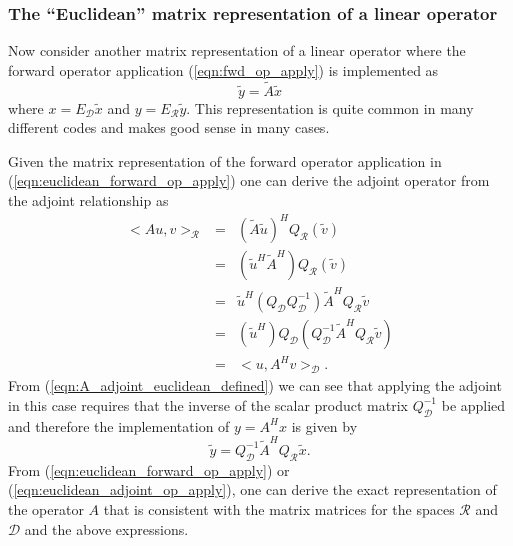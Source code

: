 \subsubsection{The ``Euclidean'' matrix representation of a linear operator}
\label{sec:euclidean_matrix_rep_linear_operator}

Now consider another matrix representation of a linear operator where the
forward operator application (\ref{eqn:fwd_op_apply}) is implemented as
%
\begin{equation}
\tilde{y} = \tilde{A} \tilde{x}
\label{eqn:euclidean_forward_op_apply}
\end{equation}
%
where $x = E_{\mathcal{D}}\tilde{x}$ and $y = E_{\mathcal{R}}\tilde{y}$.  This
representation is quite common in many different codes and makes good sense in
many cases.

Given the matrix representation of the forward operator application in
(\ref{eqn:euclidean_forward_op_apply}) one can derive the adjoint operator
from the adjoint relationship as
%
\begin{eqnarray}
<A u, v>_{\mathcal{R}}
& = & ( \tilde{A} \tilde{u} )^H Q_{\mathcal{R}} (\tilde{v}) \nonumber \\
& = & ( \tilde{u}^H \tilde{A}^H ) Q_{\mathcal{R}} (\tilde{v}) \nonumber \\
& = & \tilde{u}^H ( Q_{\mathcal{D}} Q_{\mathcal{D}}^{-1} ) \tilde{A}^H Q_{\mathcal{R}} \tilde{v} \nonumber \\
& = & ( \tilde{u}^H ) Q_{\mathcal{D}} ( Q_{\mathcal{D}}^{-1} \tilde{A}^H Q_{\mathcal{R}} \tilde{v} ) \nonumber \\
& = & <u, A^H v>_{\mathcal{D}}.
\label{eqn:A_adjoint_euclidean_defined}
\end{eqnarray}
%
From (\ref{eqn:A_adjoint_euclidean_defined}) we can see that applying the
adjoint in this case requires that the inverse of the scalar product matrix
$Q_{\mathcal{D}}^{-1}$ be applied and therefore the implementation of $y=A^H
x$ is given by
%
\begin{equation}
\tilde{y} = Q_{\mathcal{D}}^{-1} \tilde{A}^H Q_{\mathcal{R}} \tilde{x}.
\label{eqn:euclidean_adjoint_op_apply}
\end{equation}
%
From (\ref{eqn:euclidean_forward_op_apply}) or
(\ref{eqn:euclidean_adjoint_op_apply}), one can derive the exact
representation of the operator $A$ that is consistent with the matrix matrices
for the spaces $\mathcal{R}$ and $\mathcal{D}$ and the above expressions.

